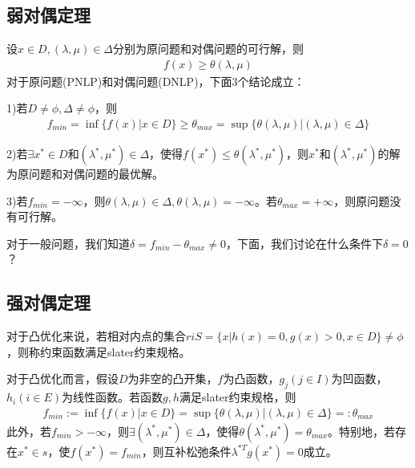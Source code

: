     \subsection{弱对偶定理}
        \par
        设$x \in D,(\lambda,\mu) \in \Delta$分别为原问题和对偶问题的可行解，则
        \begin{align*}
        f(x) \geqslant \theta(\lambda,\mu)
        \end{align*}
        对于原问题(PNLP)和对偶问题(DNLP)，下面3个结论成立：\par
        1)若$D \neq \phi,\Delta \neq \phi$，则
        \begin{align*}
        f_{min} = \inf\{f(x)|x \in D\} \geqslant {\theta}_{max}=\sup\{\theta(\lambda,\mu)|(\lambda,\mu) \in \Delta\}
        \end{align*}
        \par
        2)若$\exists x^* \in D$和$({\lambda}^*,{\mu}^*)\in \Delta$，使得$f(x^*)\leqslant \theta({\lambda}^*,{\mu}^*)$，则$x^*$和$({\lambda}^*,{\mu}^*)$的解为原问题和对偶问题的最优解。
        \par
        3)若$f_{min}=-\infty$，则$\theta(\lambda,\mu) \in \Delta,\theta(\lambda,\mu)=-\infty$。若${\theta}_{max}=+\infty$，则原问题没有可行解。
        \par
        对于一般问题，我们知道$\delta=f_{min}-{\theta}_{max} \neq 0$，下面，我们讨论在什么条件下$\delta = 0$？

    \subsection{强对偶定理}
        \begin{definition}[slater约束规格]
        对于凸优化来说，若相对内点的集合$riS=\{x|h(x)=0,g(x)>0,x\in D\}\neq \phi$，则称约束函数满足slater约束规格。
        \end{definition}
        \par
        对于凸优化而言，假设$D$为非空的凸开集，$f$为凸函数，$g_j(j\in I)$为凹函数，$h_i(i\in E)$为线性函数。若函数$g,h$满足slater约束规格，则
        \begin{align*}
        f_{min} := \inf\{f(x)|x \in D\} =\sup\{\theta(\lambda,\mu)|(\lambda,\mu) \in \Delta\}=:{\theta}_{max}
        \end{align*}
        此外，若$f_{min}>-\infty$，则$\exists ({\lambda}^*,{\mu}^*)\in \Delta$，使得$\theta({\lambda}^*,{\mu}^*)={\theta}_{max}$。特别地，若存在$x^* \in s$，使$f(x^*)=f_{min}$，则互补松弛条件${\lambda}^{*T}g(x^*)=0$成立。
